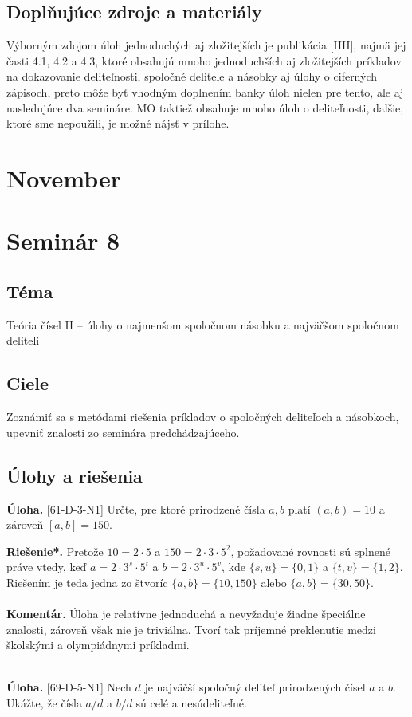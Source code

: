 \documentclass[11pt,a4paper,oneside,final]{book}
\newcommand{\kom}{\textbf{Komentár.} }
\newcommand{\ul}{\textbf{Úloha.} }
\newcommand{\rieh}{\textbf{Riešenie*.} }
\begin{document}
\subsection*{Doplňujúce zdroje a materiály}
Výborným zdojom úloh jednoduchých aj zložitejších je publikácia [HH], najmä jej časti 4.1, 4.2 a 4.3, ktoré obsahujú mnoho jednoduchších aj zložitejších príkladov na dokazovanie deliteľnosti, spoločné delitele a násobky aj úlohy o ciferných zápisoch, preto môže byť vhodným doplnením banky úloh nielen pre tento, ale aj nasledujúce dva semináre. MO taktiež obsahuje mnoho úloh o deliteľnosti, ďalšie, ktoré sme nepoužili, je možné nájsť v prílohe.


\newpage
\section{November}
\section*{Seminár 8}
\subsection*{Téma}
Teória čísel II -- úlohy o najmenšom spoločnom násobku a najväčšom spoločnom deliteli

\subsection*{Ciele}
Zoznámiť sa s metódami riešenia príkladov o spoločných deliteľoch a násobkoch, upevniť znalosti zo seminára predchádzajúceho.

\subsection*{Úlohy a riešenia}
\begin{tcolorbox}[breakable,notitle,boxrule=0pt,colback=light-gray,colframe=light-gray]\ul [61-D-3-N1] Určte, pre ktoré prirodzené čísla $a, b$ platí $(a, b) = 10$ a zároveň  $[a, b] = 150$.

\end{tcolorbox}

\rieh Pretože $10 = 2 \cdot 5$ a $150 = 2 \cdot 3 \cdot 5^2$, požadované rovnosti sú splnené práve vtedy, keď $a = 2 \cdot 3^s \cdot 5^t$ a $b = 2 \cdot 3^u \cdot 5^v$, kde $\{s, u\} = \{0, 1\}$ a $\{t, v\} = \{1, 2\}$. Riešením je teda jedna zo štvoríc $\{a, b\} = \{10, 150\}$ alebo $\{a, b\} = \{30, 50\}$.\\
\\
\kom Úloha je relatívne jednoduchá a nevyžaduje žiadne špeciálne znalosti, zároveň však nie je triviálna. Tvorí tak príjemné preklenutie medzi školskými a olympiádnymi príkladmi.\\
\\
\begin{tcolorbox}[breakable,notitle,boxrule=0pt,colback=light-gray,colframe=light-gray]\ul [69-D-5-N1] Nech $d$ je najväčší spoločný deliteľ prirodzených čísel $a$ a $b$. Ukážte, že čísla $a/d$ a $b/d$ sú celé a nesúdeliteľné.

\end{tcolorbox}
\end{document}
